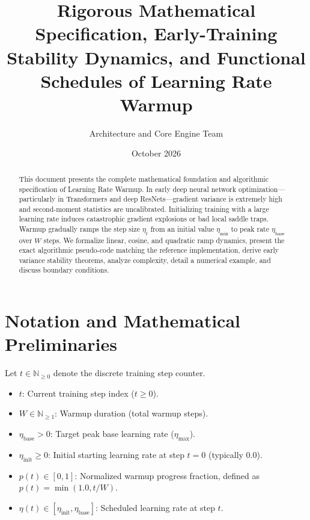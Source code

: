 \documentclass[11pt,a4paper]{article}
\title{\textbf{Rigorous Mathematical Specification, Early-Training Stability Dynamics, and Functional Schedules of Learning Rate Warmup}}
\author{Architecture and Core Engine Team}
\date{October 2026}
\theoremstyle{definition}
\begin{document}
\maketitle

\begin{abstract}
This document presents the complete mathematical foundation and algorithmic specification of Learning Rate Warmup. In early deep neural network optimization—particularly in Transformers and deep ResNets—gradient variance is extremely high and second-moment statistics are uncalibrated. Initializing training with a large learning rate induces catastrophic gradient explosions or bad local saddle traps. Warmup gradually ramps the step size $\eta_t$ from an initial value $\eta_{\text{min}}$ to peak rate $\eta_{\text{base}}$ over $W$ steps. We formalize linear, cosine, and quadratic ramp dynamics, present the exact algorithmic pseudo-code matching the reference implementation, derive early variance stability theorems, analyze complexity, detail a numerical example, and discuss boundary conditions.
\end{abstract}

\section{Notation and Mathematical Preliminaries}

Let $t \in \mathbb{N}_{\ge 0}$ denote the discrete training step counter.

\begin{itemize}
    \item $t$: Current training step index ($t \ge 0$).
    \item $W \in \mathbb{N}_{\ge 1}$: Warmup duration (total warmup steps).
    \item $\eta_{\text{base}} > 0$: Target peak base learning rate ($\eta_{\max}$).
    \item $\eta_{\text{init}} \ge 0$: Initial starting learning rate at step $t=0$ (typically $0.0$).
    \item $p(t) \in [0, 1]$: Normalized warmup progress fraction, defined as $p(t) = \min(1.0, t / W)$.
    \item $\eta(t) \in [\eta_{\text{init}}, \eta_{\text{base}}]$: Scheduled learning rate at step $t$.
\end{itemize}
\end{document}
